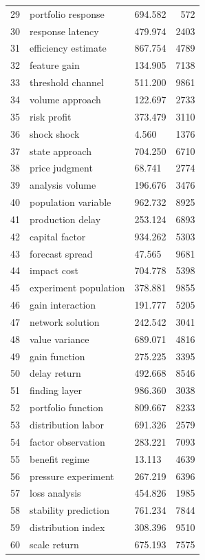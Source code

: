 \documentclass[11pt]{report}
\begin{document}
\begin{longtable}{rllr}
29 & portfolio response & 694.582 & 572 \\
30 & response latency & 479.974 & 2403 \\
31 & efficiency estimate & 867.754 & 4789 \\
32 & feature gain & 134.905 & 7138 \\
33 & threshold channel & 511.200 & 9861 \\
34 & volume approach & 122.697 & 2733 \\
35 & risk profit & 373.479 & 3110 \\
36 & shock shock & 4.560 & 1376 \\
37 & state approach & 704.250 & 6710 \\
38 & price judgment & 68.741 & 2774 \\
39 & analysis volume & 196.676 & 3476 \\
40 & population variable & 962.732 & 8925 \\
41 & production delay & 253.124 & 6893 \\
42 & capital factor & 934.262 & 5303 \\
43 & forecast spread & 47.565 & 9681 \\
44 & impact cost & 704.778 & 5398 \\
45 & experiment population & 378.881 & 9855 \\
46 & gain interaction & 191.777 & 5205 \\
47 & network solution & 242.542 & 3041 \\
48 & value variance & 689.071 & 4816 \\
49 & gain function & 275.225 & 3395 \\
50 & delay return & 492.668 & 8546 \\
51 & finding layer & 986.360 & 3038 \\
52 & portfolio function & 809.667 & 8233 \\
53 & distribution labor & 691.326 & 2579 \\
54 & factor observation & 283.221 & 7093 \\
55 & benefit regime & 13.113 & 4639 \\
56 & pressure experiment & 267.219 & 6396 \\
57 & loss analysis & 454.826 & 1985 \\
58 & stability prediction & 761.234 & 7844 \\
59 & distribution index & 308.396 & 9510 \\
60 & scale return & 675.193 & 7575 \\
\end{longtable}
\end{document}
